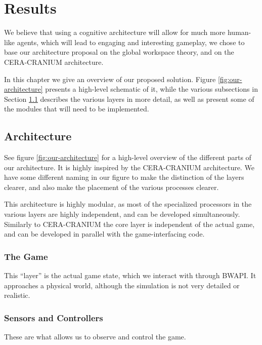 
\chapter{Results}
We believe that using a cognitive architecture will allow for much
more human-like agents, which will lead to engaging and interesting gameplay, we
chose to base our architecture proposal on the global workspace theory, and on
the CERA-CRANIUM\cite{arrabales2009ceracranium} architecture.

In this chapter we give an overview of our proposed solution. Figure
\ref{fig:our-architecture} presents a high-level schematic of it, while the
various subsections in Section \ref{sec:architecture} describes the various layers in
more detail, as well as present some of the modules that will need to be
implemented.

\section{Architecture}
\label{sec:architecture}
See figure \ref{fig:our-architecture} for a high-level overview of the
different parts of our architecture. It is highly inspired by the CERA-CRANIUM
architecture. We have some different naming in our figure to make the
distinction of the layers clearer, and also make the placement of the various
processes clearer.

This architecture is highly modular, as most of the specialized processors in
the various layers are highly independent, and can be developed simultaneously.
Similarly to CERA-CRANIUM the core layer is independent of the actual game, and
can be developed in parallel with the game-interfacing code.

\subsection{The Game}
This ``layer'' is the actual game state, which we interact with through BWAPI.
It approaches a physical world, although the simulation is not very detailed or
realistic.

\subsection{Sensors and Controllers}
These are what allows us to observe and control the game.

